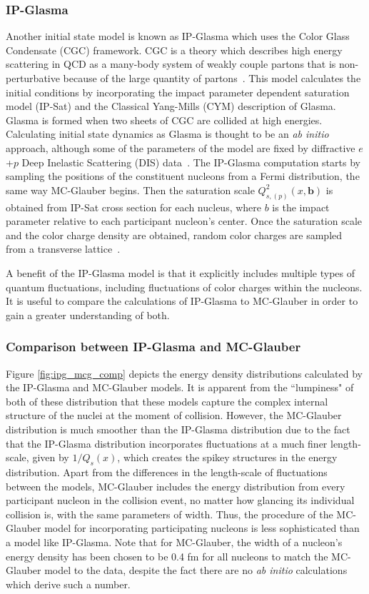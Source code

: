 \subsubsection{IP-Glasma}%
Another initial state model is known as IP-Glasma which uses the Color Glass Condensate (CGC) framework. CGC is a theory which describes high energy scattering in QCD as a many-body system of weakly couple partons that is non-perturbative because of the large quantity of partons~\cite{Iancu:2003xm}. This model calculates the initial conditions by incorporating the impact parameter dependent saturation model (IP-Sat) and the Classical Yang-Mills (CYM) description of Glasma. Glasma is formed when two sheets of CGC are collided at high energies. Calculating initial state dynamics as Glasma is thought to be an \textit{ab initio} approach, although some of the parameters of the model are fixed by diffractive $e$+$p$ Deep Inelastic Scattering (DIS) data~\cite{PhysRevLett.108.252301}. The IP-Glasma computation starts by sampling the positions of the constituent nucleons from a Fermi distribution, the same way MC-Glauber begins. Then the saturation scale $Q^2_{s,(p)}(x,\textbf{b})$ is obtained from IP-Sat cross section for each nucleus, where $b$ is the impact parameter relative to each participant nucleon's center. Once the saturation scale and the color charge density are obtained, random color charges are sampled from a transverse lattice~\cite{PhysRevLett.108.252301}.

A benefit of the IP-Glasma model is that it explicitly includes multiple types of quantum fluctuations, including fluctuations of color charges within the nucleons. It is useful to compare the calculations of IP-Glasma to MC-Glauber in order to gain a greater understanding of both.
\subsubsection{Comparison between IP-Glasma and MC-Glauber}
Figure \ref{fig:ipg_mcg_comp} depicts the energy density distributions calculated by the IP-Glasma and MC-Glauber models. It is apparent from the ``lumpiness" of both of these distribution that these models capture the complex internal structure of the nuclei at the moment of collision. However, the MC-Glauber distribution is much smoother than the IP-Glasma distribution due to the fact that the IP-Glasma distribution incorporates fluctuations at a much finer length-scale, given by $1/Q_s(x)$, which creates the spikey structures in the energy distribution. Apart from the differences in the length-scale of fluctuations between the models, MC-Glauber includes the energy distribution from every participant nucleon in the collision event, no matter how glancing its individual collision is, with the same parameters of width. Thus, the procedure of the MC-Glauber model for incorporating participating nucleons is less sophisticated than a model like IP-Glasma. Note that for MC-Glauber, the width of a nucleon's energy density has been chosen to be 0.4 fm for all nucleons to match the MC-Glauber model to the data, despite the fact there are no \textit{ab initio} calculations which derive such a number.

